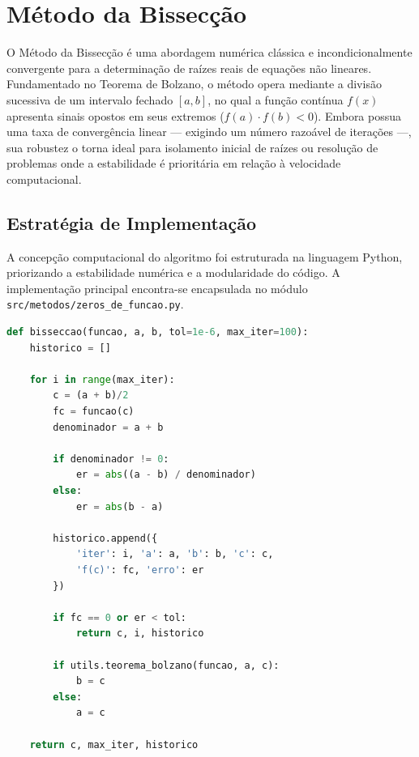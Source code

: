 \section{Método da Bissecção}
\label{sec:metodo_bisseccao}

O Método da Bissecção é uma abordagem numérica clássica e incondicionalmente convergente para a determinação de raízes reais de equações não lineares. Fundamentado no Teorema de Bolzano, o método opera mediante a divisão sucessiva de um intervalo fechado $[a, b]$, no qual a função contínua $f(x)$ apresenta sinais opostos em seus extremos ($f(a) \cdot f(b) < 0$). Embora possua uma taxa de convergência linear — exigindo um número razoável de iterações —, sua robustez o torna ideal para isolamento inicial de raízes ou resolução de problemas onde a estabilidade é prioritária em relação à velocidade computacional.

\subsection{Estratégia de Implementação}
\label{subsec:estrategia_implementacao_bisseccao}

A concepção computacional do algoritmo foi estruturada na linguagem Python, priorizando a estabilidade numérica e a modularidade do código. A implementação principal encontra-se encapsulada no módulo \texttt{src/metodos/zeros\_de\_funcao.py}.

\begin{lstlisting}[language=Python, caption={Código de implementação do Método da Bissecção}, label={lst:bisseccao_codigo}]
def bisseccao(funcao, a, b, tol=1e-6, max_iter=100):
    historico = [] 
    
    for i in range(max_iter):
        c = (a + b)/2
        fc = funcao(c)
        denominador = a + b

        if denominador != 0:
            er = abs((a - b) / denominador)
        else:
            er = abs(b - a) 
        
        historico.append({
            'iter': i, 'a': a, 'b': b, 'c': c, 
            'f(c)': fc, 'erro': er
        })
        
        if fc == 0 or er < tol:
            return c, i, historico
            
        if utils.teorema_bolzano(funcao, a, c):
            b = c
        else:
            a = c
            
    return c, max_iter, historico
\end{lstlisting}

